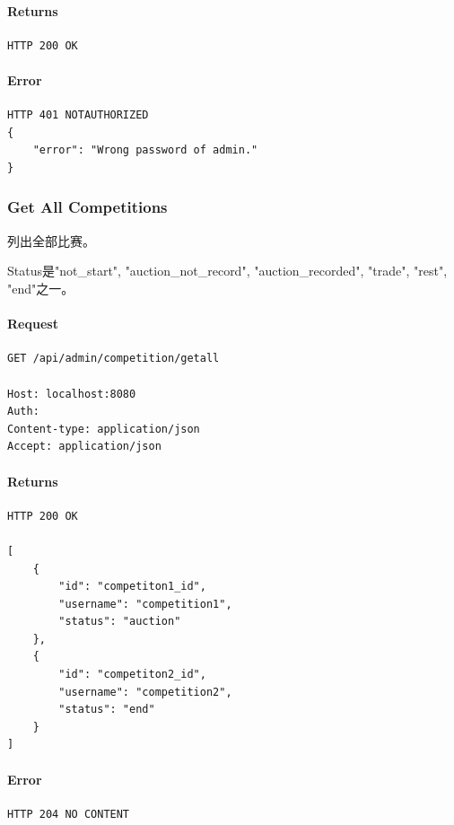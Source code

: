 \documentclass{article}
\begin{document}
\paragraph*{Returns}
\begin{lstlisting}
HTTP 200 OK

\end{lstlisting}

\paragraph*{Error}
\begin{lstlisting}
HTTP 401 NOTAUTHORIZED
{
    "error": "Wrong password of admin."
}
\end{lstlisting}


\subsubsection{Get All Competitions}

列出全部比赛。

Status是"not\_start", "auction\_not\_record", "auction\_recorded", "trade", "rest", "end"之一。

\paragraph*{Request}
\begin{lstlisting}
GET /api/admin/competition/getall

Host: localhost:8080
Auth:
Content-type: application/json
Accept: application/json
\end{lstlisting}

\paragraph*{Returns}
\begin{lstlisting}
HTTP 200 OK

[
    {
        "id": "competiton1_id",
        "username": "competition1",
        "status": "auction"
    },
    {
        "id": "competiton2_id",
        "username": "competition2",
        "status": "end"
    }
]
\end{lstlisting}

\paragraph*{Error}
\begin{lstlisting}
HTTP 204 NO CONTENT
\end{lstlisting}
\end{document}
